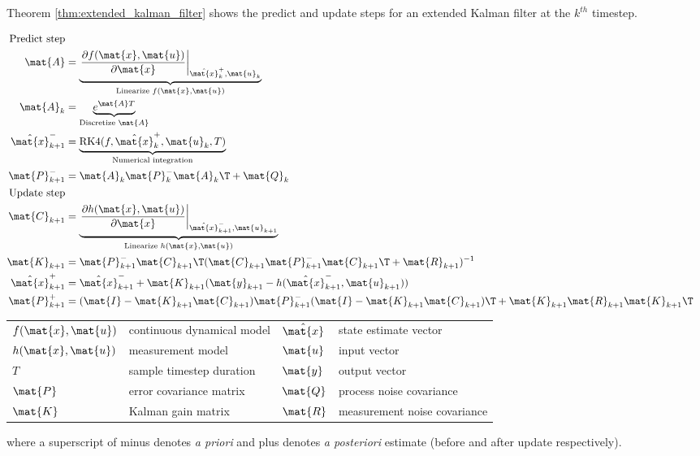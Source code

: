Theorem \ref{thm:extended_kalman_filter} shows the predict and update steps for
an extended Kalman filter at the $k^{th}$ timestep.
\begin{theorem}
  \label{thm:extended_kalman_filter}
  \begin{align}
    \text{Predict step} \nonumber \\
    \mat{A} &=
      \underbrace{\left.\frac{\partial f(\mat{x}, \mat{u})}{\partial \mat{x}}
                  \right|_{\hat{\mat{x}}_k^+, \mat{u}_k}}
                 _{\text{Linearize } f(\mat{x}, \mat{u})} \\
    \mat{A}_k &= \underbrace{e^{\mat{A}T}}_{\text{Discretize } \mat{A}} \\
    \hat{\mat{x}}_{k+1}^- &=
      \underbrace{\text{RK4}(f, \hat{\mat{x}}_k^+, \mat{u}_k, T)}
                 _{\text{Numerical integration}} \\
    \mat{P}_{k+1}^- &= \mat{A}_k \mat{P}_k^- \mat{A}_k\T + \mat{Q}_k \\
    \text{Update step} \nonumber \\
    \mat{C}_{k+1} &=
      \underbrace{\left.\frac{\partial h(\mat{x}, \mat{u})}{\partial \mat{x}}
                  \right|_{\hat{\mat{x}}_{k+1}^-, \mat{u}_{k+1}}}
                 _{\text{Linearize } h(\mat{x}, \mat{u})} \\
    \mat{K}_{k+1} &= \mat{P}_{k+1}^- \mat{C}_{k+1}\T
      (\mat{C}_{k+1}\mat{P}_{k+1}^- \mat{C}_{k+1}\T + \mat{R}_{k+1})^{-1} \\
    \hat{\mat{x}}_{k+1}^+ &=
      \hat{\mat{x}}_{k+1}^- + \mat{K}_{k+1}(\mat{y}_{k+1} -
      h(\hat{\mat{x}}_{k+1}^-, \mat{u}_{k+1})) \\
    \mat{P}_{k+1}^+ &= (\mat{I} - \mat{K}_{k+1}\mat{C}_{k+1})\mat{P}_{k+1}^-
      (\mat{I} - \mat{K}_{k+1}\mat{C}_{k+1})\T +
      \mat{K}_{k+1}\mat{R}_{k+1}\mat{K}_{k+1}\T
  \end{align}
  \begin{figurekey}
    \begin{tabular}{llll}
      $f(\mat{x}, \mat{u})$ & continuous dynamical model & $\hat{\mat{x}}$ & state estimate vector \\
      $h(\mat{x}, \mat{u})$ & measurement model & $\mat{u}$ & input vector \\
      $T$ & sample timestep duration & $\mat{y}$ & output vector \\
      $\mat{P}$ & error covariance matrix & $\mat{Q}$ & process noise covariance \\
      $\mat{K}$ & Kalman gain matrix & $\mat{R}$ & measurement noise covariance \\
    \end{tabular}
  \end{figurekey}

  where a superscript of minus denotes \textit{a priori} and plus denotes
  \textit{a posteriori} estimate (before and after update respectively).
\end{theorem}
